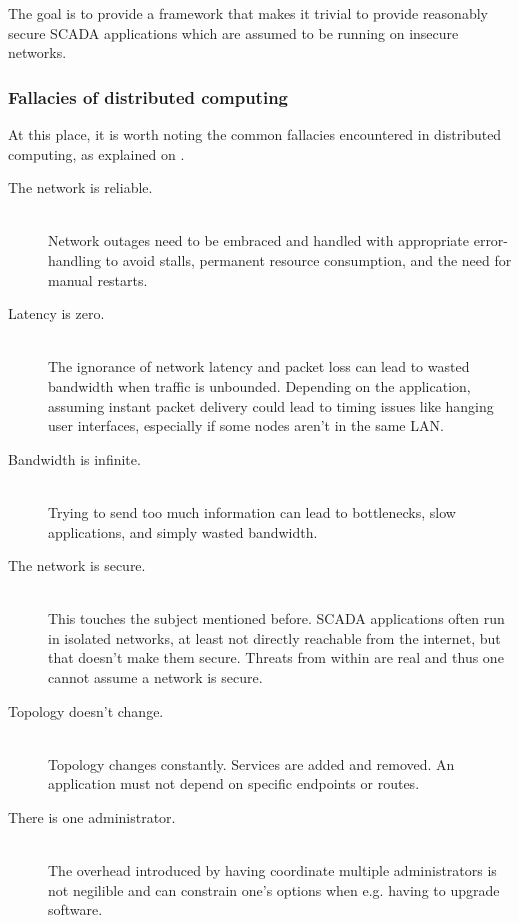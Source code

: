 The goal is to provide a framework that makes it trivial to provide reasonably
secure SCADA applications which are assumed to be running on insecure networks.

\subsubsection{Fallacies of distributed computing}
At this place, it is worth noting the common fallacies encountered in
distributed computing, as explained on \cite{dcomp:fallacies}.


\begin{description}
	\item [The network is reliable.] \hfill\\
		Network outages need to be embraced and handled with
		appropriate error-handling to avoid stalls, permanent
		resource consumption, and the need for manual restarts.

	\item [Latency is zero.] \hfill\\
		The ignorance of network latency and packet loss can lead to
		wasted bandwidth when traffic is unbounded. Depending on the
		application, assuming instant packet delivery could lead to
		timing issues like hanging user interfaces, especially if some
		nodes aren't in the same LAN.

	\item [Bandwidth is infinite.] \hfill\\
		Trying to send too much information can lead to bottlenecks,
		slow applications, and simply wasted bandwidth.

	\item [The network is secure.] \hfill\\
		This touches the subject mentioned before. SCADA applications
		often run in isolated networks, at least not directly reachable
		from the internet, but that doesn't make them secure. Threats
		from within are real and thus one cannot assume a network is
		secure.

	\item [Topology doesn't change.] \hfill\\
		Topology changes constantly. Services are added and removed. An
		application must not depend on specific endpoints or routes.

	\item [There is one administrator.] \hfill\\
		The overhead introduced by having coordinate multiple
		administrators is not negilible and can constrain one's options
		when e.g. having to upgrade software.


\end{description}
